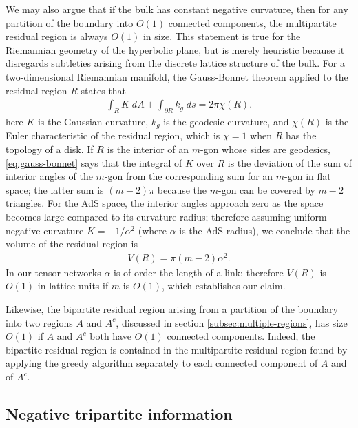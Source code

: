 \documentclass[12pt]{article}
\theoremstyle{plain}
\theoremstyle{plain}
\theoremstyle{plain}
\theoremstyle{plain}
\theoremstyle{result}
\theoremstyle{remark}
\theoremstyle{conjecture}
\theoremstyle{observation}
\theoremstyle{definition}
\theoremstyle{corollary}
\theoremstyle{definition}
\theoremstyle{definition}
\theoremstyle{assumption}
\theoremstyle{definition}
\theoremstyle{problem}
\theoremstyle{fact}
\begin{document}
We may also argue that if the bulk has constant negative curvature, then for any partition of the boundary into $O(1)$ connected components, the multipartite residual region is always $O(1)$ in size. This statement is true for the Riemannian geometry of the hyperbolic plane, but is merely heuristic because it disregards subtleties arising from the discrete lattice structure of the bulk. For a two-dimensional Riemannian manifold, the Gauss-Bonnet theorem applied to the residual region $R$ states that
\begin{align}\label{eq:gauss-bonnet}
\int_R K\;dA+\int_{\partial R}k_g\;ds=2\pi\chi(R).
\end{align}
here $K$ is the Gaussian curvature, $k_g$ is the geodesic curvature, and $\chi(R)$ is the Euler characteristic of the residual region, which is $\chi=1$ when $R$ has the topology of a disk. If $R$ is the interior of an $m$-gon whose sides are geodesics, \eqref{eq:gauss-bonnet} says that the integral of $K$ over $R$ is the deviation of the sum of interior angles of the $m$-gon from the corresponding sum for an $m$-gon in flat space; the latter sum is $(m-2)\pi$ because the $m$-gon can be covered by $m-2$ triangles. For the AdS space, the interior angles approach zero as the space becomes large compared to its curvature radius; therefore assuming uniform negative curvature $K=-1/\alpha^2$ (where $\alpha$ is the AdS radius), we conclude that the volume of the residual region is 
\begin{align}
V(R) = \pi(m-2)\alpha^2.
\end{align}
In our tensor networks $\alpha$ is of order the length of a link; therefore $V(R)$ is $O(1)$ in lattice units if $m$ is $O(1)$, which establishes our claim.

Likewise, the bipartite residual region arising from a partition of the boundary into two regions $A$ and $A^c$, discussed in section \ref{subsec:multiple-regions}, has size $O(1)$ if $A$ and $A^c$ both have $O(1)$ connected components. 
Indeed, the bipartite residual region is contained in the multipartite residual region found by applying the greedy algorithm separately to each connected component of $A$ and of $A^c$. 

\subsection{Negative tripartite information}
\end{document}
